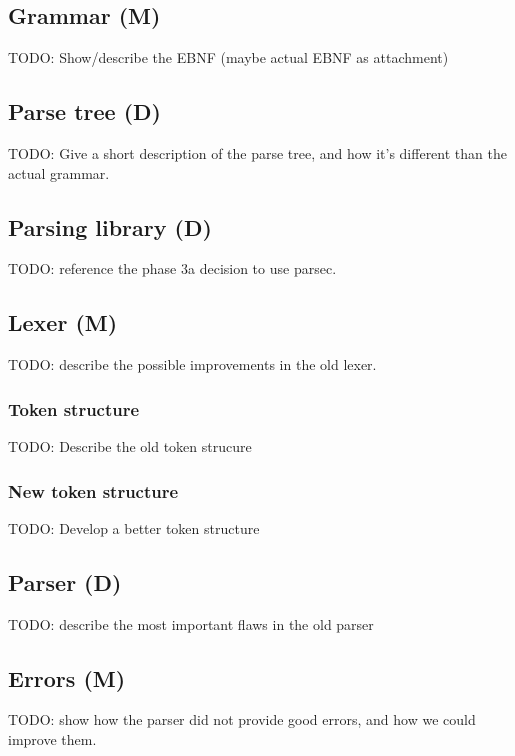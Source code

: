 \subsection{Grammar (M)}
\label{subsec:analysis-grammar}
%
%
TODO: Show/describe the EBNF (maybe actual EBNF as attachment)

\subsection{Parse tree (D)}
\label{subsec:analysis-parse-tree}
TODO: Give a short description of the parse tree, and how it's different than the actual grammar.

\subsection{Parsing library (D)}
\label{subsec:analysis-parsing-lib}
TODO: reference the phase 3a decision to use parsec.

\subsection{Lexer (M)}
\label{subsec:analysis-lexer}
TODO: describe the possible improvements in the old lexer.

\subsubsection{Token structure}
TODO: Describe the old token strucure

\subsubsection{New token structure}
TODO: Develop a better token structure

\subsection{Parser (D)}
\label{subsec:analysis-parser}
TODO: describe the most important flaws in the old parser

\subsection{Errors (M)}
\label{subsec:analysis-errors}
TODO: show how the parser did not provide good errors, and how we could improve them.
